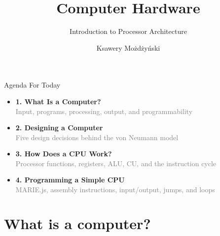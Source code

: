 \documentclass[aspectratio=169,10pt]{beamer}
\title{Computer Hardware}
\subtitle{Introduction to Processor Architecture}
\author{Ksawery Możdżyński}
\date{}
\begin{document}
\begin{frame}
  \titlepage
\end{frame}

\begin{frame}{Agenda For Today}
  \Large
  \begin{itemize}
    \item[\textcolor{DeepBlue}{\faLaptop}] \textbf{1. What Is a Computer?} \\
    \textcolor{gray}{\small Input, programs, processing, output, and programmability}
    \vspace{0.25cm}

    \item[\textcolor{DeepBlue}{\faCogs}] \textbf{2. Designing a Computer} \\
    \textcolor{gray}{\small Five design decisions behind the von Neumann model}
    \vspace{0.25cm}

    \item[\textcolor{DeepBlue}{\faMicrochip}] \textbf{3. How Does a CPU Work?} \\
    \textcolor{gray}{\small Processor functions, registers, ALU, CU, and the instruction cycle}
    \vspace{0.25cm}

    \item[\textcolor{DeepBlue}{\faLaptop}] \textbf{4. Programming a Simple CPU} \\
    \textcolor{gray}{\small MARIE.js, assembly instructions, input/output, jumps, and loops}
  \end{itemize}
\end{frame}

\section{What is a computer?}
\end{document}
